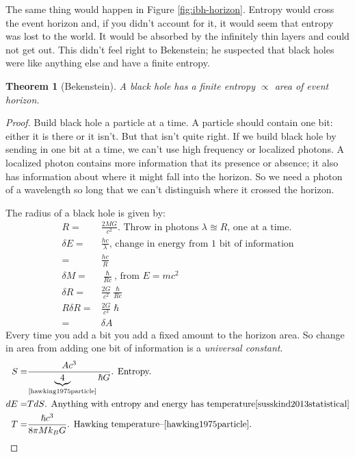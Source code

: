 \documentclass[]{article}
\newtheorem{thm}{Theorem}
\begin{document}
The same thing would happen in Figure \ref{fig:ibh-horizon}. Entropy would cross the event horizon and, if you didn't account for it, it would seem that entropy was lost to the world. It would be absorbed by the infinitely thin layers and could not get out. This didn't feel right to Bekenstein; he suspected that black holes were like anything else and have a finite entropy.

\begin{thm}[Bekenstein]
	A black hole has a finite entropy $\propto$ area of event horizon.
\end{thm}

\begin{proof}
	Build black hole a particle at a time. A particle should contain one bit: either it is there or it isn't. But that isn't quite right. If we build black hole by sending in one bit at a time, we can't use high frequency or localized photons. A localized photon contains more information that its presence or absence; it also has information about where it might fall into the horizon. So we need a photon of a wavelength so long that we can't distinguish where it crossed the horizon.
	
	The radius of a black hole is given by:
	\begin{align*}
	R =& \frac{2 M G}{c^2} \text{. Throw in photons $\lambda\approxeq R$, one at a time.}\\
	\delta E =& \frac{hc}{\lambda} \text{, change in energy from 1 bit of information}\\
	=& \frac{hc}{R}\\
	\delta M =& \frac{\hslash}{Rc} \text{, from $E=mc^2$}\\
	\delta R =& \frac{2G}{c^2}  \frac{\hslash}{Rc}\\
	R \delta R=& \frac{2G}{c^3}  \hslash\\
	=& \delta A
	\end{align*}
	Every time you add a bit you add a fixed amount to the horizon  area. So change in area from adding one bit of information is a \emph{universal constant}.
	\begin{align*}
	S =& \frac{A c^3}{\underbrace{4}_\text{\cite{hawking1975particle}} \hslash G} \text{. Entropy.}\\
	dE =& T dS \text{. Anything with entropy and energy has temperature\cite{susskind2013statistical}}\\
	T =& \frac{\hslash  c^3}{8 \pi M k_B G} \text{. Hawking temperature--\cite{hawking1975particle}.}
	\end{align*}
\end{proof}
\end{document}
